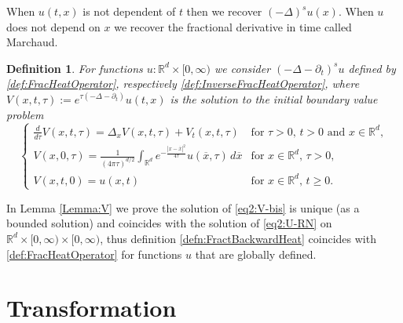 \documentclass[11pt, twoside, notitlepage]{amsart}
\newtheorem{defn}[theorem]{Definition}
\newcommand\R{\mathbb{R}}
\numberwithin{equation}{section}
\begin{document}
When $u(t,x)$ is not dependent of $t$ then we recover $(-\Delta)^s u(x)$. When $u$ does not depend on $x$ we recover the fractional derivative in time  called Marchaud.




\begin{defn}\label{defn:FractBackwardHeat}
For functions $u:\R^d\times [0,\infty)$ we consider $(-\Delta-\partial_t)^s u$ defined by \eqref{def:FracHeatOperator}, respectively \eqref{def:InverseFracHeatOperator}, where $V(x,t,\tau):= e^{\tau (-\Delta-\partial_t) } u(t,x)$ is the solution to the initial boundary value  problem
\begin{equation}\label{eq2:V-bis}
  \left\{ \begin{array}{ll}
  \frac{d}{d\tau}V(x,t,\tau)=\Delta_{x} V(x,t,\tau) +  V_t(x,t,\tau) &\text{for }\tau>0,\, t >0 \text{ and } x \in \R^d,  \\[2mm]
  V(x,0,\tau)= \frac{     1    }{ (4 \pi \tau)^{d/2}  }  \int_{\R^d}  e^{ - \frac{|x-\overline{x}|^2 }{4 \tau} }  u(\overline{x}, \tau ) \, d \overline{x}  &\text{for } x \in \R^d, \, \tau>0, \\[2mm]
  V(x,t,0)=u(x,t) &\text{for } x \in \R^d, \, t\ge0.
    \end{array}
    \right.
\end{equation}
\end{defn}
In Lemma \ref{Lemma:V} we prove the solution of \eqref{eq2:V-bis} is unique (as a bounded solution) and coincides with the solution of \eqref{eq2:U-RN} on $\R^d \times [0,\infty) \times [0,\infty)$, thus definition \eqref{defn:FractBackwardHeat} coincides with \eqref{def:FracHeatOperator} for functions $u$ that are globally defined.




\section{Transformation}
\end{document}
